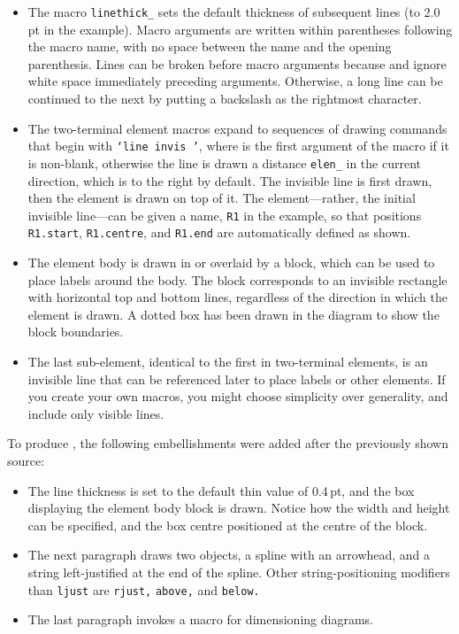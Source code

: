 \begin{itemize}
\item The macro {\tt linethick\_} sets the default thickness of subsequent
   lines (to 2.0\,pt in the example).
   Macro arguments are written within parentheses
   following the macro name, with no space between the name and the
   opening parenthesis.  Lines can be broken before macro arguments
   because \Mfour and \dpic ignore white space immediately preceding
   arguments.  Otherwise, a long line can be continued to the next
   by putting a backslash as the rightmost character. 
\item The two-terminal element macros expand to sequences of drawing commands
   that begin with {\tt `line invis \linespec'},
   where \linespec is the first argument of the macro if it
   is non-blank, otherwise the line is drawn a distance
   {\tt elen\_} in the current direction, which is to the right by
   default.
   The invisible line is first drawn, then the element is drawn
   on top of it.
   The element---rather, the initial invisible line---can
   be given a name, {\tt R1} in the example, so that positions
   {\tt R1.start}, {\tt R1.centre}, and {\tt R1.end} are automatically
   defined as shown.
\item The element body is drawn in or overlaid by a block, which can be
   used to place labels around the body.
   The block corresponds to an invisible rectangle with horizontal top
   and bottom lines, regardless of the direction in which the element
   is drawn.  A dotted box has been drawn in the diagram to show the
   block boundaries.
\item The last sub-element, identical to the first in two-terminal
   elements, is an invisible line that can be referenced later to
   place labels or other elements.
   If you create your own macros, you might choose simplicity over generality,
   and include only visible lines.
  \end{itemize}

To produce , the following embellishments
were added after the previously shown source:
{\small  }

\begin{itemize}
\item The line thickness is set to the default thin value of \hbox{0.4\,pt},
   and the box displaying the element body block is drawn.  Notice how the
   width and height can be specified, and the box centre positioned at
   the centre of the block.
\item The next paragraph draws two objects, a spline with an arrowhead,
   and a string left-justified at the end of the spline.  Other
   string-positioning modifiers than {\tt ljust} are {\tt rjust,}
   {\tt above,} and {\tt below.}

\item The last paragraph invokes a macro for dimensioning diagrams.
   \end{itemize}

